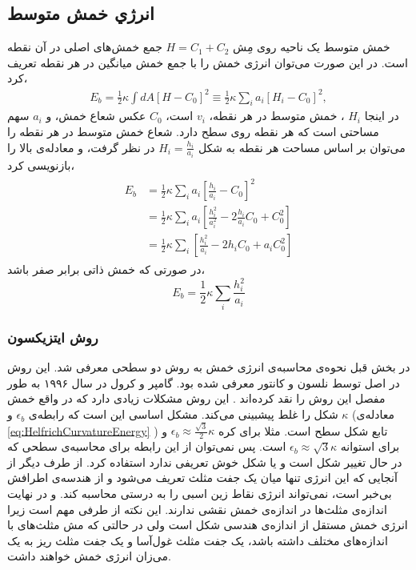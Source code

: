 \setRL



\subsection{
انرژي خمش متوسط
}


خمش متوسط یک ناحیه روی مِش 
$H=C_1+C_2$
جمع خمش‌های اصلی در آن نقطه است. در این صورت می‌توان انرژی خمش را با جمع خمش میانگین در هر نقطه تعریف کرد،
\begin{eqnarray}
E_{b}=\frac{1}{2}\kappa\int dA \left[H-C_0\right]^2\equiv\frac{1}{2}\kappa\sum_i a_i \left[H_i-C_0\right]^2,
\label{eq:bendingDiscretisation}
\end{eqnarray}
در اینجا 
$H_i$
، خمش متوسط در هر نقطه،  
$v_i$
است، 
$C_0$
عکس شعاع خمش،  و 
$a_i$
سهم مساحتی است که هر نقطه روی سطح دارد. شعاع خمش متوسط در هر نقطه را می‌توان بر اساس مساحت هر نقطه به شکل 
$H_i=\frac{h_i}{a_i}$
 در نظر گرفت، و معادله‌ی بالا را بازنویسی کرد،
\begin{eqnarray}
\begin{aligned}
E_{b}&=\frac{1}{2}\kappa\sum_i a_i \left[\frac{h_i}{a_i}-C_0\right]^2\\
&=\frac{1}{2}\kappa\sum_i a_i \left[\frac{h_i^2}{a_i^2}-2\frac{h_i}{a_i}C_0+C_0^2\right]\\
&=\frac{1}{2}\kappa\sum_i \left[\frac{h_i^2}{a_i}-2h_iC_0+a_iC_0^2\right]
\end{aligned}
\label{eq:bendingDiscretisationSpontaneous}
\end{eqnarray}
در صورتی که خمش ذاتی برابر صفر باشد، 
\begin{equation}
E_{b}=\frac{1}{2}\kappa\sum_i \frac{h_i^2}{a_i}
\end{equation}


\subsubsection{
روش ایتزیکسون
}
در بخش قبل نحوه‌ی محاسبه‌ی انرژی خمش به روش دو سطحی
معرفی شد. این روش در اصل توسط نلسون و کانتور
\cite{NelsonPRL1987}
معرفی شده بود. گامپر و کرول در سال ۱۹۹۶ به طور مفصل این روش را نقد کرده‌اند
\cite{Gompper1996}
. این روش مشکلات زیادی دارد که در واقع خمش شکل را غلط پیشبینی می‌کند. مشکل اساسی این است که رابطه‌ی 
$\epsilon_b$
و 
$\kappa$
(معادله‌ی  
\ref{eq:HelfrichCurvatureEnergy}
) تابع شکل سطح است.  مثلا برای کره
$\epsilon_b\approx\frac{\sqrt{3}}{2}\kappa$
و برای استوانه
$\epsilon_b\approx\sqrt{3}\kappa$
است. پس نمی‌توان از این رابطه برای محاسبه‌ی سطحی که در حال تغییر شکل است و یا شکل خوش تعریفی ندارد استفاده کرد. 
از طرف دیگر از آنجایی که این انرژی تنها میان یک جفت مثلث تعریف می‌شود و از هندسه‌ی اطرافش بی‌خبر است، نمی‌تواند انرژی نقاط زین اسبی را به درستی محاسبه کند. و در نهایت اندازه‌ی مثلث‌ها در اندازه‌ی خمش نقشی ندارند. این نکته از طرفی مهم است زیرا انرژی خمش مستقل از اندازه‌ی هندسی شکل است ولی در حالتی که مش مثلث‌های با اندازه‌های مختلف داشته باشد، یک جفت مثلث غول‌آسا و یک جفت مثلث ریز به یک می‌زان انرژی خمش خواهند داشت.

